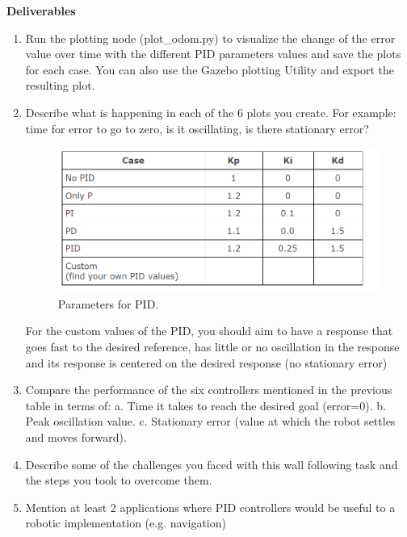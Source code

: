 \documentclass[12pt]{article}
\begin{document}
\textbf{Deliverables}
\begin{enumerate}
    \item Run the plotting node (plot\_odom.py) to visualize the change of the error value over time with the different PID parameters values and save the plots for each case. You can also use the Gazebo plotting Utility and export the resulting plot.
    
    \item Describe what is happening in each of the 6 plots you create. For example: time for error to go to zero, is it oscillating, is there stationary error?
    
    \begin{figure}[H]
    \vspace{-10pt}
    \centering\includegraphics[width=14cm]{images/pidparameter.png}\vspace{-10pt}
    \caption{Parameters for PID.}\label{fig:pid}
    \end{figure}
    
    For the custom values of the PID, you should aim to have a response that goes fast to the desired reference, has little or no oscillation in the response and its response is centered on the desired response (no stationary error)
    
    \item Compare the performance of the six controllers mentioned in the previous table in terms of:
    a. Time it takes to reach the desired goal (error=0).
    b. Peak oscillation value.
    c. Stationary error (value at which the robot settles and moves forward).
    
    \item Describe some of the challenges you faced with this wall following task and the steps you took to overcome them.
    
    \item Mention at least 2 applications where PID controllers would be useful to a robotic implementation (e.g. navigation)
\end{enumerate}
\end{document}
